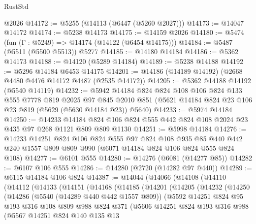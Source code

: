 \begin{lexlean}{RustStd}
\begin{coremodule}
    @2026
@14172 := @5255 (@14113 (@6447 (@5260 @2027)))
@14173 := @14047 @14172
@14174 := @5238 @14173
@14175 := @14159 @2026
@14180 := @5474 (fun (Γ : @5249) => @14174 (@14122 (@6454 @14175)))
@14184 := @5487 (@5511 (@5500 @5513)) @5277
@14185 := @14180 @14184
@14186 := @5362 @14173
@14188 := @14120 (@5289 @14184)
@14189 := @5238 @14188
@14192 := @5296 @14184 @6453 @14175
@14201 := @14186 (@14189 @14192) (@2668 @4480 @4476 @14172 @4487 (@2535 @14172))
@14205 := @5362 @14188 @14192 (@5540 @14119)
@14232 := @5942
    @14184
    @824
    @824
    @108
    @106
    @824
    @133
    @555
    @7778
    @819
    @2025
    @97
    @845
    @2010
    @851
    (@5621 @14184 @824 @23 @106 @23 @819 (@5629 (@5630 @14184 @23)) @5640)
@14233 := @5974 @14184
@14250 := @14233
    @14184
    @824
    @106
    @824
    @555
    @442
    @824
    @108
    @2024
    @23
    @435
    @97
    @268
    @1121
    @809
    @809
    @1130
@14251 := @5998 @14184
@14276 := @14233
    @14251
    @824
    @106
    @824
    @555
    @97
    @824
    @108
    @935
    @85
    @440
    @442
    @240
    @1557
    @809
    @809
    @990
    (@6071 @14184 @824 @106 @824 @555 @824 @108)
@14277 := @6101 @555
@14280 := @14276 (@6081 (@14277 @85))
@14282 := @6107 @106 @555
@14286 := @14280 (@2720 (@14282 @97 @440))
@14289 := @6115 @14184 @106 @824
@14387 := @14044
    (@14066
      (@14108
        (@14110
          (@14112
            (@14133
              (@14151
                (@14168
                  (@14185
                    (@14201
                      (@14205
                        (@14232
                          (@14250
                            (@14286
                              (@5540 (@14289 @440 @442 @1557 @809))
                              (@5592
                                @14251
                                @824
                                @95
                                @193
                                @316
                                @108
                                @809
                                @988
                                @824
                                @371
                                (@5606
                                  @14251
                                  @824
                                  @193
                                  @316
                                  @988
                                  (@5567
                                    @14251
                                    @824
                                    @140
                                    @135
                                    @13

\end{coremodule}
\end{lexlean}
